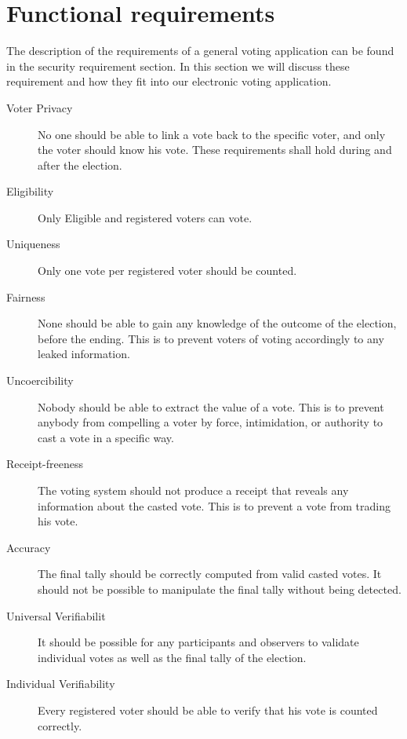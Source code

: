 \section{Functional requirements}
The description of the requirements of a general voting application can be found in the security requirement section. In this section we will discuss these requirement and how they fit into our electronic voting application.





\begin{description}
    \item [Voter Privacy]
        No one should be able to link a vote back to the specific voter, and only the voter should
        know his vote. These requirements shall hold during and after the election.  
    
    \item [Eligibility]    
        Only Eligible and registered voters can vote. 
    
    \item [Uniqueness]
        Only one vote per registered voter should be counted.
    
    \item [Fairness]
        None should be able to gain any knowledge of the outcome of the election, before the ending. This is to prevent voters of voting accordingly to any leaked information. 
    
    \item [Uncoercibility]
        Nobody should be able to extract the value of a vote. This is to prevent anybody from compelling a voter by force, intimidation, or authority to cast a vote in a specific way. 
    
    \item [Receipt-freeness] 
        The voting system should not produce a receipt that reveals any information about the casted vote. This is to prevent a vote from trading his vote. 
    
    \item [Accuracy] 
        The final tally should be correctly computed from valid casted votes. It should not be
        possible to manipulate the final tally without being detected. 
    
    \item [Universal Verifiabilit]
        It should be possible for any participants and observers to validate individual votes as well as the final tally of the election. 
    
    \item [Individual Verifiability]    
        Every registered voter should be able to verify that his vote is counted correctly. 
    
\end{description}
